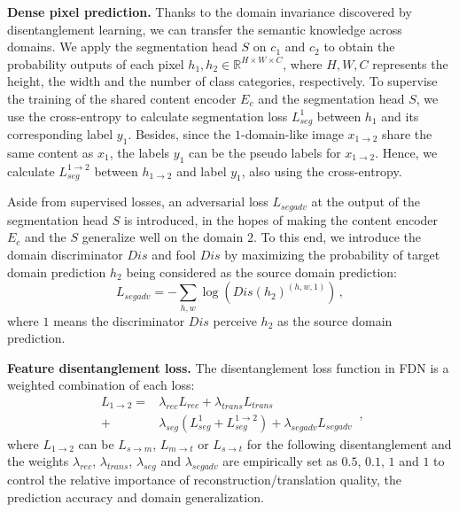 \documentclass[10pt,twocolumn,letterpaper]{article}
\def\imd{m}
\def\td{t}
\newcommand{\heading}[1]{\noindent\textbf{#1}}
\begin{document}
\heading{Dense pixel prediction.}
Thanks to the domain invariance discovered by disentanglement learning, we can transfer the semantic knowledge across domains.
We apply the segmentation head $S$ on $c_1$ and $c_2$ to obtain the probability outputs of each pixel $h_1, h_2\!\in\! \mathbb{R}^{H\times W \times C}$, 
where $H, W, C$ represents the height, the width and the number of class categories, respectively.
To supervise the training of the shared content encoder $E_{c}$ and the segmentation head $S$,
we use the cross-entropy to calculate segmentation loss ${L}_{seg}^1$ between $h_1$ and its corresponding label $y_1$.
Besides, since the $1$-domain-like image ${x}_{1 \rightarrow 2}$ share the same content as $x_{1}$, the labels $y_1$ can be the pseudo labels for ${x}_{1 \rightarrow 2}$. Hence, we calculate ${L}_{seg}^{1 \rightarrow 2}$ between $h_{1 \rightarrow 2}$ and label $y_1$, also using the cross-entropy.


Aside from supervised losses, an adversarial loss ${L}_{segadv}$ at the output of the segmentation head $S$ is introduced, in the hopes of making the content encoder $E_{c}$ and the $S$ generalize well on the domain $2$. To this end, we introduce the domain discriminator $\mathit{Dis}$ and fool $\mathit{Dis}$ by maximizing the probability of target domain prediction $h_{2}$ being considered as the source domain prediction:
\begin{equation}
{L}_{segadv}=-\sum_{h, w} \log \left(\mathit{Dis}\left(h_{2}\right)^{(h, w, 1)}\right)\,,
\end{equation}
where $1$ means the discriminator $\mathit{Dis}$ perceive $h_{2}$ as the source domain prediction. 


\heading{Feature disentanglement loss.}
The disentanglement loss function in FDN is a weighted combination of each loss:
\begin{equation} 
\begin{split}
{L}_{1 \rightarrow 2} =& \lambda_{rec}{L}_{rec} + \lambda_{trans}{L}_{trans} \\
+& \lambda_{seg}({L}_{seg}^{1}+{L}_{seg}^{1 \rightarrow 2}) 
+ \lambda_{segadv}{L}_{segadv}
\end{split}\,,
\label{equa:stage1_loss}
\end{equation}
where ${L}_{1 \rightarrow 2}$ can be ${L}_{s\rightarrow\imd}$, ${L}_{\imd \rightarrow\td}$ or ${L}_{s\rightarrow\td}$ for the following disentanglement and the weights $\lambda_{rec}$, $\lambda_{trans}$, $\lambda_{seg}$ and $\lambda_{segadv}$ are empirically set as $0.5$, $0.1$, $1$ and $1$ to control the relative importance of reconstruction/translation quality, the prediction accuracy and domain generalization.
\end{document}

